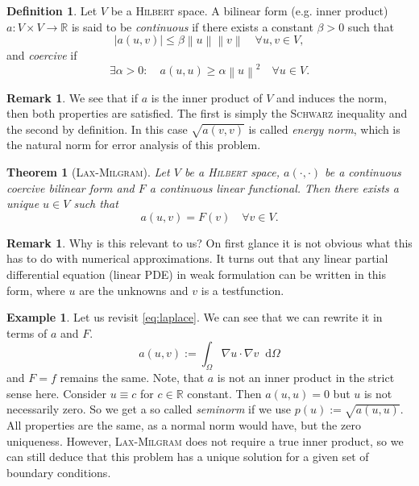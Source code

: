 \documentclass[12pt,a4paper,twoside, open=right]{scrreprt}
\theoremstyle{definition}
\newtheorem{rem}[auf]{Remark}
\newtheorem{defn}[auf]{Definition}
\newtheorem{bsp}[auf]{Example}
\theoremstyle{plain}
\newtheorem{sa}[auf]{Theorem}
\newcommand{\abs}[1]{\left\vert #1\right\vert}
\newcommand{\rr}{\mathbb{R}}
\newcommand{\norm}[1]{\left\lVert#1\right\rVert}
\newcommand{\D}{\mathop{}\!\mathrm{d}}
\begin{document}
\begin{defn}
    Let $V$ be a \textsc{Hilbert} space. A bilinear form (e.g. inner product) $a\colon V\times V\to\rr$ is said to be \emph{continuous} if there exists a constant $\beta>0$ such that
    \begin{equation}
        \abs{a(u,v)}\le\beta\norm{u}\norm{v}\quad \forall u,v\in V,
    \end{equation}
    and \emph{coercive} if 
    \begin{equation}
        \exists\alpha>0\colon \quad a(u,u)\ge \alpha\norm{u}^2\quad\forall u\in V.
    \end{equation}
\end{defn}
\begin{rem}
    We see that if $a$ is the inner product of $V$ and induces the norm, then both properties are satisfied. The first is simply the \textsc{Schwarz} inequality and the second by definition. In this case $\sqrt{a(v,v)}$ is called \emph{energy norm}, which is the natural norm for error analysis of this problem.
\end{rem}
\begin{sa}[\textsc{Lax-Milgram}]
    Let $V$ be a \textsc{Hilbert} space, $a(\cdot,\cdot)$ be a continuous coercive bilinear form and $F$ a continuous linear functional. Then there exists a unique $u\in V$ such that
    \begin{equation}
        a(u,v)=F(v)\quad \forall v\in V.
    \end{equation}
\end{sa}
\begin{rem}
    Why is this relevant to us? On first glance it is not obvious what this has to do with numerical approximations. It turns out that any linear partial differential equation (linear PDE) in weak formulation can be written in this form, where $u$ are the unknowns and $v$ is a testfunction.
\end{rem}
\begin{bsp}
    Let us revisit \eqref{eq:laplace}. We can see that we can rewrite it in terms of $a$ and $F$. 
    \begin{equation}
        a(u,v):=\int_\Omega \nabla u\cdot \nabla v\D\Omega
    \end{equation}
    and $F=f$ remains the same. Note, that $a$ is not an inner product in the strict sense here. Consider $u\equiv c$ for $c\in\rr$ constant. Then $a(u,u)=0$ but $u$ is not necessarily zero. So we get a so called \emph{seminorm} if we use $p(u):=\sqrt{a(u,u)}$. All properties are the same, as a normal norm would have, but the zero uniqueness. However, \textsc{Lax-Milgram} does not require a true inner product, so we can still deduce that this problem has a unique solution for a given set of boundary conditions.
\end{bsp}
\end{document}
